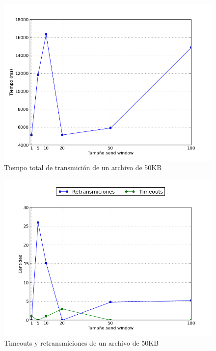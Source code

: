 \begin{figure}[H]
\begin{center}
\includegraphics[width=\textwidth,keepaspectratio]{tiempos50.png}
\end{center}
\caption{Tiempo total de transmición de un archivo de 50KB} \label{figura3}
\end{figure}

\begin{figure}[H]
\begin{center}
\includegraphics[width=\textwidth,keepaspectratio]{timeouts-retransmiciones50.png}
\end{center}
\caption{Timeouts y retransmiciones de un archivo de 50KB} \label{figura4}
\end{figure}
